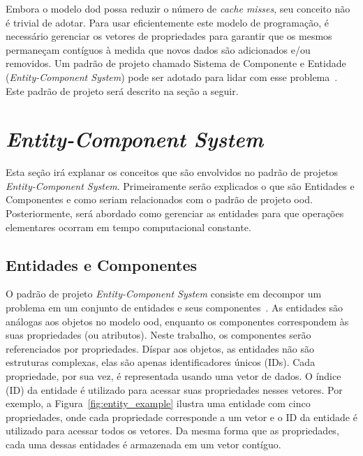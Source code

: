 Embora o modelo \ac{dod} possa reduzir o número de \textit{cache misses}, seu conceito não é trivial de adotar.
Para usar eficientemente este modelo de programação, é necessário gerenciar os vetores de propriedades para garantir que os mesmos permaneçam contíguos à medida que novos dados são adicionados e/ou removidos. Um padrão de projeto chamado Sistema de Componente e Entidade (\textit{Entity-Component System}) pode ser adotado para lidar com esse problema~\cite{nystrom2014game}. Este padrão de projeto será descrito na seção a seguir.

\section{\textit{Entity-Component System}}
\label{sec:entity_component_system}

Esta seção irá explanar os conceitos que são envolvidos no padrão de projetos \textit{Entity-Component System}.
Primeiramente serão explicados o que são Entidades e Componentes e como seriam relacionados com o padrão de projeto \ac{ood}.
Posteriormente, será abordado como gerenciar as entidades para que operações elementares ocorram em tempo computacional constante.

\subsection{Entidades e Componentes}

O padrão de projeto \textit{Entity-Component System} consiste em decompor um problema em um conjunto de entidades e seus componentes~\cite{nystrom2014game}. As entidades são análogas aos objetos no modelo \ac{ood}, enquanto os componentes correspondem às suas propriedades (ou atributos). Neste trabalho, os componentes serão referenciados por propriedades. Díspar aos objetos, as entidades não são estruturas complexas, elas são apenas identificadores únicos (IDs). Cada propriedade, por sua vez, é representada usando uma vetor de dados. O índice (ID) da entidade é utilizado para acessar suas propriedades nesses vetores. Por exemplo, a Figura~\ref{fig:entity_example} ilustra uma entidade com cinco propriedades, onde cada propriedade corresponde a um vetor e o ID da entidade é utilizado para acessar todos os vetores. Da mesma forma que as propriedades, cada uma dessas entidades é armazenada em um vetor contíguo.

